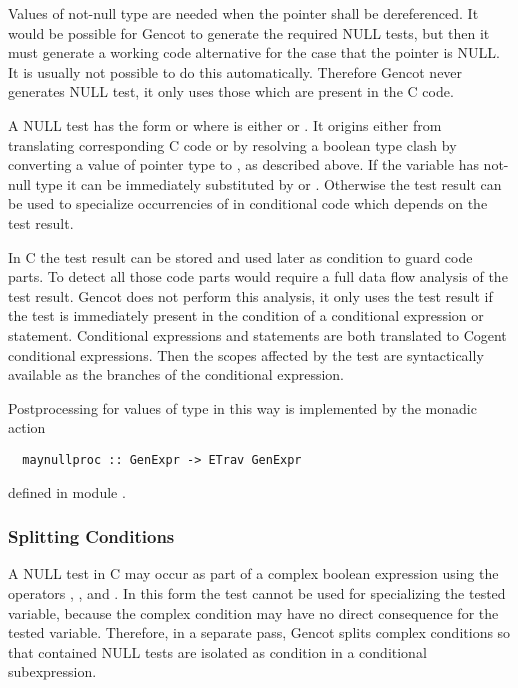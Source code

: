 Values of not-null type are needed when the pointer shall be dereferenced. It would be possible for Gencot to generate the required
NULL tests, but then it must generate a working code alternative for the case that the pointer is NULL. It is usually not possible to
do this automatically. Therefore Gencot never generates NULL test, it only uses those which are present in the C code.

A NULL test has the form  or  where  is either \code{==} or \code{/=}. It origins
either from translating corresponding C code or by resolving a boolean type clash by converting a value of pointer type to , as
described above. If the variable  has not-null type it can be immediately substituted by  or . Otherwise the
test result can be used to specialize occurrencies of  in conditional code which depends on the test result.

In C the test result can be stored and used later as condition to guard code parts. To detect all those code parts would require a full
data flow analysis of the test result. Gencot does not perform this analysis, it only uses the test result if the test is immediately
present in the condition of a conditional expression or statement. Conditional expressions and statements are both translated to Cogent
conditional expressions. Then the scopes affected by the test are syntactically available as the branches of the conditional expression.

Postprocessing for values of  type in this way is implemented by the monadic action
\begin{verbatim}
  maynullproc :: GenExpr -> ETrav GenExpr
\end{verbatim}
defined in module .

\subsubsection{Splitting Conditions}

A NULL test in C may occur as part of a complex boolean expression using the operators \code{\&\&}, \code{||}, and \code{!}. In this form
the test cannot be used for specializing the tested variable, because the complex condition may have no direct consequence for the tested
variable. Therefore, in a separate pass, Gencot splits complex conditions so that contained NULL tests are isolated as condition in a
conditional subexpression.

